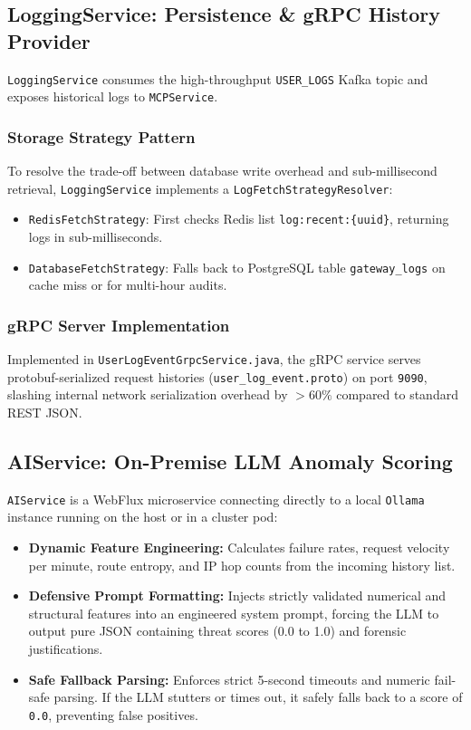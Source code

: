 \documentclass[12pt, a4paper]{article}
\newcommand{\tech}[1]{\texttt{\color{accentblue}#1}}
\newcommand{\service}[1]{\texttt{\color{accentteal}#1}}
\begin{document}
\subsection{LoggingService: Persistence \& gRPC History Provider}

\service{LoggingService} consumes the high-throughput \texttt{USER\_LOGS} Kafka topic and exposes historical logs to \service{MCPService}.

\subsubsection{Storage Strategy Pattern}
To resolve the trade-off between database write overhead and sub-millisecond retrieval, \service{LoggingService} implements a \tech{LogFetchStrategyResolver}:
\begin{itemize}[noitemsep]
    \item \tech{RedisFetchStrategy}: First checks Redis list \texttt{log:recent:\{uuid\}}, returning logs in sub-milliseconds.
    \item \tech{DatabaseFetchStrategy}: Falls back to PostgreSQL table \texttt{gateway\_logs} on cache miss or for multi-hour audits.
\end{itemize}

\subsubsection{gRPC Server Implementation}
Implemented in \tech{UserLogEventGrpcService.java}, the gRPC service serves protobuf-serialized request histories (\texttt{user\_log\_event.proto}) on port \texttt{9090}, slashing internal network serialization overhead by $>60\%$ compared to standard REST JSON.

\subsection{AIService: On-Premise LLM Anomaly Scoring}

\service{AIService} is a WebFlux microservice connecting directly to a local \tech{Ollama} instance running on the host or in a cluster pod:
\begin{itemize}[leftmargin=*, itemsep=4pt]
    \item \textbf{Dynamic Feature Engineering:} Calculates failure rates, request velocity per minute, route entropy, and IP hop counts from the incoming history list.
    \item \textbf{Defensive Prompt Formatting:} Injects strictly validated numerical and structural features into an engineered system prompt, forcing the LLM to output pure JSON containing threat scores (0.0 to 1.0) and forensic justifications.
    \item \textbf{Safe Fallback Parsing:} Enforces strict 5-second timeouts and numeric fail-safe parsing. If the LLM stutters or times out, it safely falls back to a score of \texttt{0.0}, preventing false positives.
\end{itemize}
\end{document}
